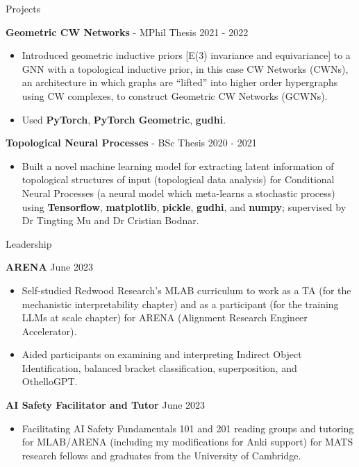 \documentclass[hidelinks]{resume} %
\begin{document}
\begin{rSection}{Projects}

\textbf{Geometric CW Networks} - MPhil Thesis
\hfill{2021 - 2022}
\begin{itemize}
    \item Introduced geometric inductive priors [E(3) invariance and equivariance] to a GNN with a topological inductive prior, in this case CW Networks (CWNs), an architecture in which graphs are ``lifted'' into higher order hypergraphs using CW complexes, to construct Geometric CW Networks (GCWNs).
    \item Used \textbf{PyTorch}, \textbf{PyTorch Geometric}, \textbf{gudhi}.
\end{itemize}

\textbf{Topological Neural Processes} - BSc Thesis
\hfill{2020 - 2021}
\begin{itemize}
    \item Built a novel machine learning model for extracting latent information of topological structures of input (topological data analysis) for Conditional Neural Processes (a neural model which meta-learns a stochastic process) using \textbf{Tensorflow}, \textbf{matplotlib}, \textbf{pickle}, \textbf{gudhi}, and \textbf{numpy}; supervised by Dr Tingting Mu and Dr Cristian Bodnar.
\end{itemize}

\end{rSection}
\begin{rSection}{Leadership}

\textbf{ARENA}
\hfill{June 2023}
\begin{itemize}
    \item Self-studied Redwood Research's MLAB curriculum to work as a TA (for the mechanistic interpretability chapter) and as a participant (for the training LLMs at scale chapter) for ARENA (Alignment Research Engineer Accelerator).
    \item Aided participants on examining and interpreting Indirect Object Identification, balanced bracket classification, superposition, and OthelloGPT.
\end{itemize}

\textbf{AI Safety Facilitator and Tutor}
\hfill{June 2023}
\begin{itemize}
    \item Facilitating AI Safety Fundamentals 101 and 201 reading groups and tutoring for MLAB/ARENA (including my modifications for Anki support) for MATS research fellows and graduates from the University of Cambridge.
\end{itemize}

\end{rSection}
\end{document}
